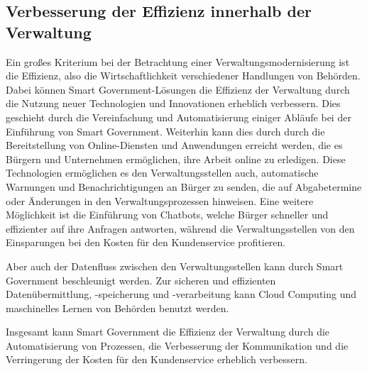 \subsection{Verbesserung der Effizienz innerhalb der Verwaltung}
Ein großes Kriterium bei der Betrachtung einer Verwaltungsmodernisierung ist die Effizienz, also die Wirtschaftlichkeit verschiedener Handlungen von Behörden.
Dabei können Smart Government-Lösungen die Effizienz der Verwaltung durch die Nutzung neuer Technologien und Innovationen erheblich verbessern.
Dies geschieht durch die Vereinfachung und Automatisierung einiger Abläufe bei der Einführung von Smart Government.
Weiterhin kann dies durch durch die Bereitstellung von Online-Diensten und Anwendungen erreicht werden, die es Bürgern und Unternehmen ermöglichen, ihre Arbeit online zu erledigen. 
Diese Technologien ermöglichen es den Verwaltungsstellen auch, automatische Warnungen und Benachrichtigungen an Bürger zu senden, die auf Abgabetermine oder Änderungen in den Verwaltungsprozessen hinweisen. 
Eine weitere Möglichkeit ist die Einführung von Chatbots, welche Bürger schneller und effizienter auf ihre Anfragen antworten, während die Verwaltungsstellen von den Einsparungen bei den Kosten für den Kundenservice profitieren. 
\par
Aber auch der Datenfluss zwischen den Verwaltungsstellen kann durch Smart Government beschleunigt werden. 
Zur sicheren und effizienten Datenübermittlung, -speicherung und -verarbeitung kann Cloud Computing und maschinelles Lernen von Behörden benutzt werden.
\par
Insgesamt kann Smart Government die Effizienz der Verwaltung durch die Automatisierung von Prozessen, die Verbesserung der Kommunikation und die Verringerung der Kosten für den Kundenservice erheblich verbessern. 
